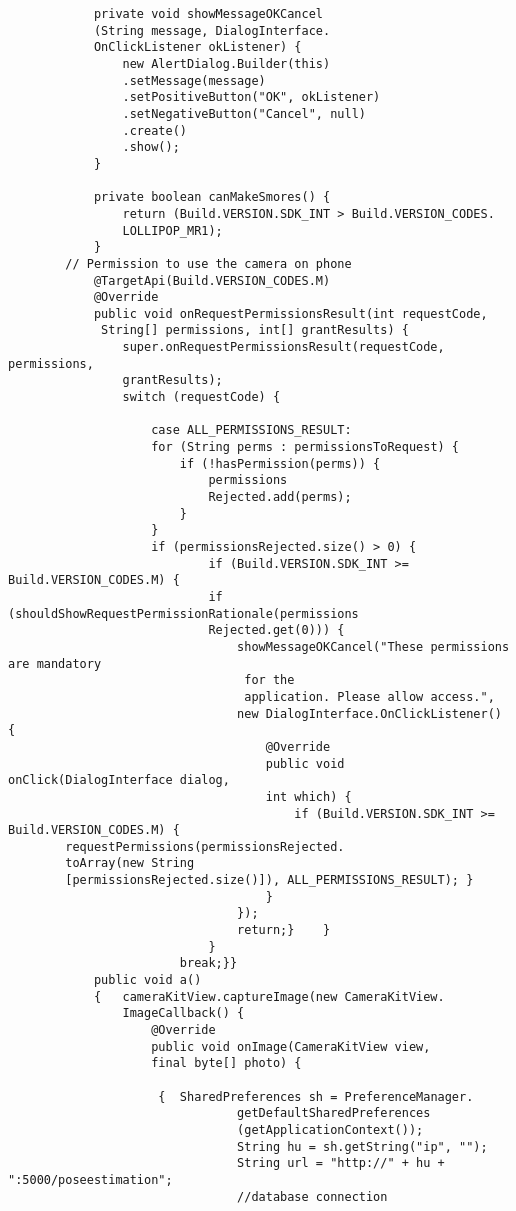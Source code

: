 \documentclass[a4paper,12pt,toc=flat]{report}
\begin{document}
{{{{\begin{itemize}
\begin{verbatim}
 			private void showMessageOKCancel
 			(String message, DialogInterface.
 			OnClickListener okListener) {
 				new AlertDialog.Builder(this)
 				.setMessage(message)
 				.setPositiveButton("OK", okListener)
 				.setNegativeButton("Cancel", null)
 				.create()
 				.show();
 			}
 			
 			private boolean canMakeSmores() {
 				return (Build.VERSION.SDK_INT > Build.VERSION_CODES.
 				LOLLIPOP_MR1);
 			}
 		// Permission to use the camera on phone
 			@TargetApi(Build.VERSION_CODES.M)
 			@Override
 			public void onRequestPermissionsResult(int requestCode,
 			 String[] permissions, int[] grantResults) {
 				super.onRequestPermissionsResult(requestCode, permissions, 
 				grantResults);
 				switch (requestCode) {
 					
 					case ALL_PERMISSIONS_RESULT:
 					for (String perms : permissionsToRequest) {
 						if (!hasPermission(perms)) {
 							permissions
 							Rejected.add(perms);
 						}
 					}
 					if (permissionsRejected.size() > 0) {
 							if (Build.VERSION.SDK_INT >= Build.VERSION_CODES.M) {
 							if (shouldShowRequestPermissionRationale(permissions
 							Rejected.get(0))) {
 								showMessageOKCancel("These permissions are mandatory
 								 for the
 								 application. Please allow access.",
 								new DialogInterface.OnClickListener() {
 									@Override
 									public void onClick(DialogInterface dialog, 
 									int which) {
 										if (Build.VERSION.SDK_INT >= Build.VERSION_CODES.M) {
 		requestPermissions(permissionsRejected.
 		toArray(new String
 		[permissionsRejected.size()]), ALL_PERMISSIONS_RESULT);	}
 									}
 								});
 								return;}	}
 							}
 						break;}}
 			public void a()
 			{	cameraKitView.captureImage(new CameraKitView.
 				ImageCallback() {
 					@Override
 					public void onImage(CameraKitView view, 
 					final byte[] photo) {
 						
 					 {	SharedPreferences sh = PreferenceManager.
 								getDefaultSharedPreferences
 								(getApplicationContext());
 								String hu = sh.getString("ip", "");
 								String url = "http://" + hu + ":5000/poseestimation";
 								//database connection
 								

\end{verbatim}
\end{itemize}}}}}
\end{document}
